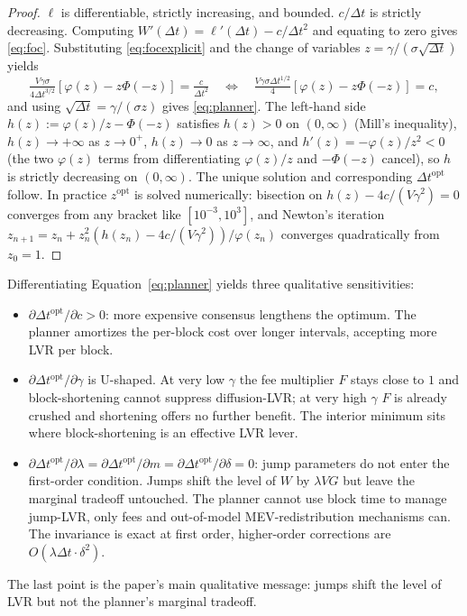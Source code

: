 \documentclass[runningheads]{llncs}
\newcommand{\dt}{\Delta t}
\newcommand{\1}{\mathbf{1}}
\begin{document}
\begin{proof}
$\ell$ is differentiable, strictly increasing, and bounded. $c/\dt$ is strictly decreasing. Computing $W'(\dt) = \ell'(\dt) - c/\dt^2$ and equating to zero gives \eqref{eq:foc}. Substituting \eqref{eq:focexplicit} and the change of variables $z = \gamma/(\sigma\sqrt{\dt})$ yields
\[
\tfrac{V\gamma\sigma}{4\dt^{3/2}}[\varphi(z) - z\Phi(-z)] = \tfrac{c}{\dt^2}
\quad\Longleftrightarrow\quad
\tfrac{V\gamma\sigma\dt^{1/2}}{4}[\varphi(z) - z\Phi(-z)] = c,
\]
and using $\sqrt{\dt} = \gamma/(\sigma z)$ gives \eqref{eq:planner}. The left-hand side $h(z) := \varphi(z)/z - \Phi(-z)$ satisfies $h(z) > 0$ on $(0,\infty)$ (Mill's inequality), $h(z) \to +\infty$ as $z\to 0^+$, $h(z) \to 0$ as $z\to\infty$, and
$h'(z) = -\varphi(z)/z^2 < 0$ (the two $\varphi(z)$ terms from differentiating $\varphi(z)/z$ and $-\Phi(-z)$ cancel),
so $h$ is strictly decreasing on $(0,\infty)$. The unique solution and corresponding $\dt^{\mathrm{opt}}$ follow. In practice $z^{\mathrm{opt}}$ is solved numerically: bisection on $h(z) - 4c/(V\gamma^2) = 0$ converges from any bracket like $[10^{-3}, 10^{3}]$, and Newton's iteration $z_{n+1} = z_n + z_n^2(h(z_n) - 4c/(V\gamma^2))/\varphi(z_n)$ converges quadratically from $z_0 = 1$.
\end{proof}

\begin{remark}\label{rem:cs}
Differentiating Equation~\eqref{eq:planner} yields three qualitative sensitivities:
\begin{itemize}
\item $\partial \dt^{\mathrm{opt}}/\partial c > 0$: more expensive consensus lengthens the optimum. The planner amortizes the per-block cost over longer intervals, accepting more LVR per block.
\item $\partial \dt^{\mathrm{opt}}/\partial \gamma$ is U-shaped. At very low $\gamma$ the fee multiplier $F$ stays close to $1$ and block-shortening cannot suppress diffusion-LVR; at very high $\gamma$ $F$ is already crushed and shortening offers no further benefit. The interior minimum sits where block-shortening is an effective LVR lever.
\item $\partial \dt^{\mathrm{opt}}/\partial \lambda = \partial \dt^{\mathrm{opt}}/\partial m = \partial \dt^{\mathrm{opt}}/\partial \delta = 0$: jump parameters do not enter the first-order condition. Jumps shift the level of $W$ by $\lambda V G$ but leave the marginal tradeoff untouched. The planner cannot use block time to manage jump-LVR, only fees and out-of-model MEV-redistribution mechanisms can. The invariance is exact at first order, higher-order corrections are $O(\lambda\dt \cdot \delta^2)$.
\end{itemize}
The last point is the paper's main qualitative message: jumps shift the level of LVR but not the planner's marginal tradeoff.
\end{remark}
\end{document}
